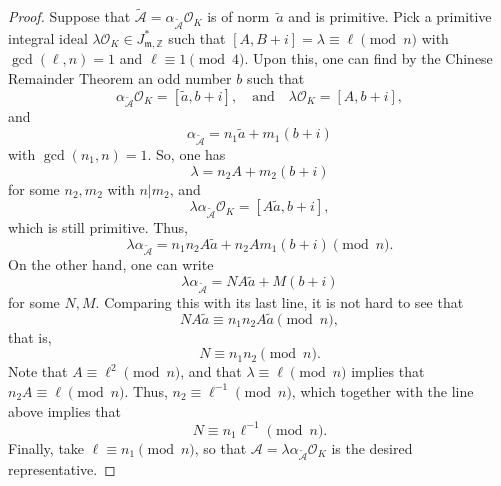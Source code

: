 \documentclass[11pt, reqno]{amsart}
\theoremstyle{plain}
\theoremstyle{definition}
\numberwithin{equation}{section}
\begin{document}
\begin{proof}
    Suppose that $\tilde{\mathcal{A}}={\alpha}_{\tilde{\mathcal{A}}}\mathcal{O}_{K}$ is of norm~$\tilde{a}$ and is primitive. Pick a primitive integral ideal $\lambda\mathcal{O}_{K}\in J_{\mathfrak{m},\mathbb{Z}}^{*}$ such that $[A,B+i]=\lambda\equiv \ell\pmod{n}$ with $\gcd(\ell,n)=1$ and $\ell\equiv 1\pmod{4}$. Upon this, one can find by the Chinese Remainder Theorem an odd number $b$ such that
 $$
    \alpha_{\tilde{\mathcal{A}}}\mathcal{O}_{K}=[\tilde{a},b+i],\quad\mbox{and}\quad \lambda\mathcal{O}_{K}=[A,b+i],
    $$
    and 
     $$
     \alpha_{\tilde{\mathcal{A}}}=n_{1}\tilde{a}+m_{1}(b+i)
     $$
     with $\gcd(n_{1},n)=1$.
     So, one has
     $$
     \lambda=n_{2}A+m_{2}(b+i)
     $$
      for some $n_{2},m_{2}$ with $n|m_{2}$, and
    $$
    \lambda\alpha_{\tilde{\mathcal{A}}}\mathcal{O}_{K}=[A\tilde{a},b+i],
    $$
    which is still primitive. Thus, 
    $$
    \lambda\alpha_{\tilde{\mathcal{A}}}=n_{1}n_{2}A\tilde{a}+n_{2}Am_{1}(b+i)\pmod{n}.
    $$
    On the other hand, one can write
    $$
    \lambda\alpha_{\tilde{\mathcal{A}}}=NA\tilde{a}+M(b+i)
    $$
    for some $N,M$.
Comparing this with its last line,    it is not hard to see that
    $$
    NA\tilde{a}\equiv n_{1}n_{2}A\tilde{a}\pmod{n},
    $$
    that is,
    $$
    N\equiv n_{1}n_{2}\pmod{n}.
    $$
    Note that $A\equiv \ell^{2}\pmod{n}$, and that $\lambda\equiv\ell\pmod{n}$ implies that $n_{2}A\equiv\ell\pmod{n}$. Thus, $n_{2}\equiv\ell^{-1}\pmod{n}$, which together with the line above implies that
    $$
    N\equiv n_{1}\ell^{-1}\pmod{n}.
    $$
  Finally, take $\ell\equiv n_{1}\pmod{n}$, so that $\mathcal{A}=\lambda\alpha_{\tilde{\mathcal{A}}}\mathcal{O}_{K}$ is the desired representative.
\end{proof}


\end{document}
